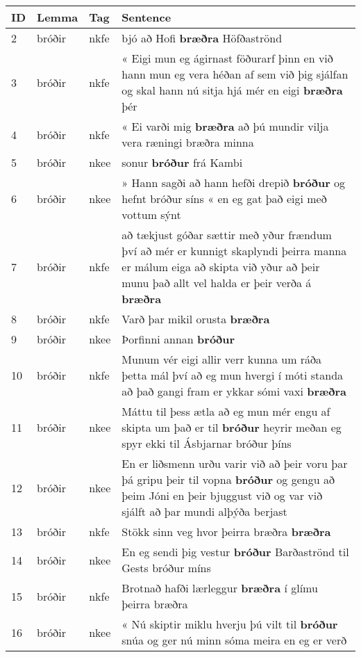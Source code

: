 \documentclass{article}
\date{}
\begin{document}
\maketitle
\noindent
\begin{longtable}{p{1cm}|p{1cm}|p{1cm}|p{13cm}}
ID&Lemma&Tag&Sentence\\
\hline
2&bróðir&nkfe&bjó að Hofi \textbf{bræðra} Höfðaströnd\\
\hline
3&bróðir&nkfe&« Eigi mun eg ágirnast föðurarf þinn en við hann mun eg vera héðan af sem við þig sjálfan og skal hann nú sitja hjá mér en eigi \textbf{bræðra} þér\\
\hline
4&bróðir&nkfe&« Ei varði mig \textbf{bræðra} að þú mundir vilja vera ræningi bræðra minna\\
\hline
5&bróðir&nkee&sonur \textbf{bróður} frá Kambi\\
\hline
6&bróðir&nkee&» Hann sagði að hann hefði drepið \textbf{bróður} og hefnt bróður síns « en eg gat það eigi með vottum sýnt\\
\hline
7&bróðir&nkfe&að tækjust góðar sættir með yður frændum því að mér er kunnigt skaplyndi þeirra manna er málum eiga að skipta við yður að þeir munu það allt vel halda er þeir verða á \textbf{bræðra} \\
\hline
8&bróðir&nkfe&Varð þar mikil orusta \textbf{bræðra} \\
\hline
9&bróðir&nkee&Þorfinni annan \textbf{bróður} \\
\hline
10&bróðir&nkfe&Munum vér eigi allir verr kunna um ráða þetta mál því að eg mun hvergi í móti standa að það gangi fram er ykkar sómi vaxi \textbf{bræðra} \\
\hline
11&bróðir&nkee&Máttu til þess ætla að eg mun mér engu af skipta um það er til \textbf{bróður} heyrir meðan eg spyr ekki til Ásbjarnar bróður þíns\\
\hline
12&bróðir&nkee&En er liðsmenn urðu varir við að þeir voru þar þá gripu þeir til vopna \textbf{bróður} og gengu að þeim Jóni en þeir bjuggust við og var við sjálft að þar mundi alþýða berjast\\
\hline
13&bróðir&nkfe&Stökk sinn veg hvor þeirra bræðra \textbf{bræðra} \\
\hline
14&bróðir&nkee&En eg sendi þig vestur \textbf{bróður} Barðaströnd til Gests bróður míns\\
\hline
15&bróðir&nkfe&Brotnað hafði lærleggur \textbf{bræðra} í glímu þeirra bræðra\\
\hline
16&bróðir&nkee&« Nú skiptir miklu hverju þú vilt til \textbf{bróður} snúa og ger nú minn sóma meira en eg er verð\\

\end{longtable}
\end{document}
